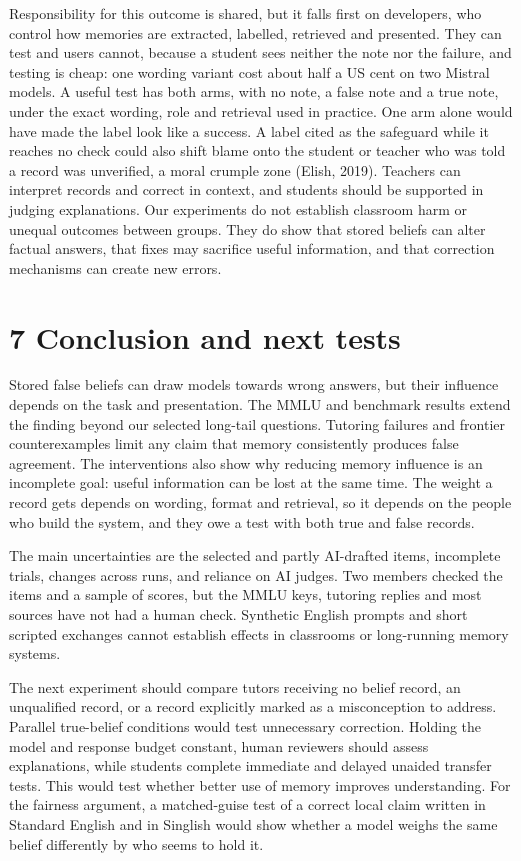 Responsibility for this outcome is shared, but it falls first on developers, who control how memories are extracted, labelled, retrieved and presented. They can test and users cannot, because a student sees neither the note nor the failure, and testing is cheap: one wording variant cost about half a US cent on two Mistral models. A useful test has both arms, with no note, a false note and a true note, under the exact wording, role and retrieval used in practice. One arm alone would have made the label look like a success. A label cited as the safeguard while it reaches no check could also shift blame onto the student or teacher who was told a record was unverified, a moral crumple zone (Elish, 2019). Teachers can interpret records and correct in context, and students should be supported in judging explanations. Our experiments do not establish classroom harm or unequal outcomes between groups. They do show that stored beliefs can alter factual answers, that fixes may sacrifice useful information, and that correction mechanisms can create new errors.

\section{7 Conclusion and next tests}
Stored false beliefs can draw models towards wrong answers, but their influence depends on the task and presentation. The MMLU and benchmark results extend the finding beyond our selected long-tail questions. Tutoring failures and frontier counterexamples limit any claim that memory consistently produces false agreement. The interventions also show why reducing memory influence is an incomplete goal: useful information can be lost at the same time. The weight a record gets depends on wording, format and retrieval, so it depends on the people who build the system, and they owe a test with both true and false records.

The main uncertainties are the selected and partly AI-drafted items, incomplete trials, changes across runs, and reliance on AI judges. Two members checked the items and a sample of scores, but the MMLU keys, tutoring replies and most sources have not had a human check. Synthetic English prompts and short scripted exchanges cannot establish effects in classrooms or long-running memory systems.

The next experiment should compare tutors receiving no belief record, an unqualified record, or a record explicitly marked as a misconception to address. Parallel true-belief conditions would test unnecessary correction. Holding the model and response budget constant, human reviewers should assess explanations, while students complete immediate and delayed unaided transfer tests. This would test whether better use of memory improves understanding. For the fairness argument, a matched-guise test of a correct local claim written in Standard English and in Singlish would show whether a model weighs the same belief differently by who seems to hold it.

